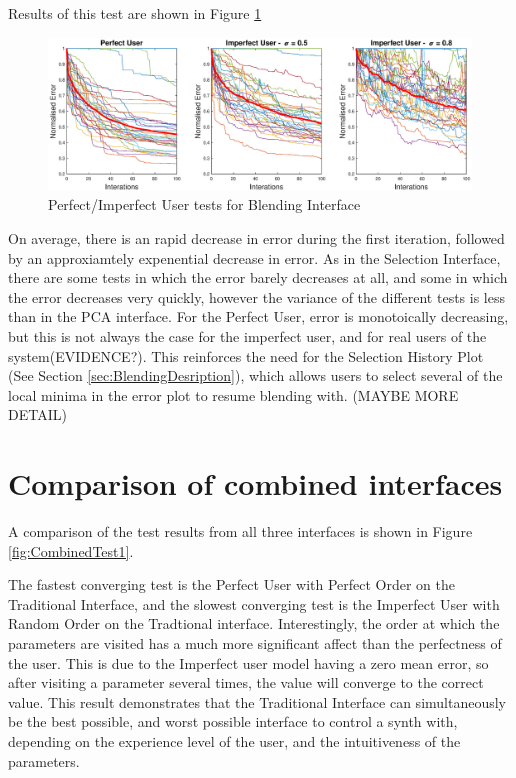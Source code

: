 \documentclass[11pt, oneside]{report}   	%
\begin{document}
Results of this test are shown in Figure \ref{fig:BlendingTest1}
\begin{figure}
	\hspace{-70pt}
	\includegraphics[width = 8in]{BlendingInterfaceTests1.eps}
	\caption{Perfect/Imperfect User tests for Blending Interface}
	\label{fig:BlendingTest1}
\end{figure}
On average, there is an rapid decrease in error during the first iteration, followed by an approxiamtely expenential decrease in error.
As in the Selection Interface, there are some tests in which the error barely decreases at all, and some in which the error decreases very quickly, however the variance of the different tests is less than in the PCA interface. For the Perfect User, error is monotoically decreasing, but this is not always the case for the imperfect user, and for real users of the system(EVIDENCE?). This reinforces the need for the Selection History Plot (See Section \ref{sec:BlendingDesription}), which allows users to select several of the local minima in the error plot to resume blending with. (MAYBE MORE DETAIL)

\section{Comparison of combined interfaces}
A comparison of the test results from all three interfaces is shown in Figure \ref{fig:CombinedTest1}. 

The fastest converging test is the Perfect User with Perfect Order on the Traditional Interface, and the slowest converging test is the Imperfect User with Random Order on the Tradtional interface. Interestingly, the order at which the parameters are visited has a much more significant affect than the perfectness of the user. This is due to the Imperfect user model having a zero mean error, so after visiting a parameter several times, the value will converge to the correct value. This result demonstrates that the Traditional Interface can simultaneously be the best possible, and worst possible interface to control a synth with, depending on the experience level of the user, and the intuitiveness of the parameters.
\end{document}
